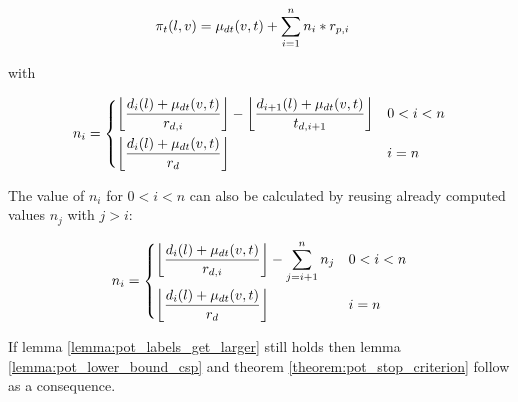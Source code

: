 \begin{align}\label{eq:multiple_pauses_pot}
	\pi_t(l,v) & = \drivingtime(v,t) + \sum_{i=1}^n{ n_i * \restr_{p,i}}
\end{align}

with

\begin{align}\label{eq:number_pauses}
	n_i =\begin{dcases}
		\floor*{ \frac{d_{i}(l) + \drivingtime(v,t)}{\restr_{d,i}} } - \floor*{ \frac{d_{i+1}(l) + \drivingtime(v,t)}{t_{d,i+1}} } & 0 < i < n \\
		\floor*{ \frac{d_{i}(l) + \drivingtime(v,t)}{\restr_d} }                                                                   & i=n
	\end{dcases}
\end{align}

The value of $n_i$ for $0 < i < n$ can also be calculated by reusing already computed values $n_j$ with $j > i$:

\begin{align*}
	n_i =\begin{dcases}
		\floor*{ \frac{d_{i}(l) + \drivingtime(v,t)}{\restr_{d,i}} } - \sum_{j=i+1}^{n}{n_{j} } & 0 < i < n \\
		\floor*{ \frac{d_{i}(l) + \drivingtime(v,t)}{\restr_d} }                                & i=n
	\end{dcases}
\end{align*}

If lemma \ref{lemma:pot_labels_get_larger} still holds then lemma \ref{lemma:pot_lower_bound_csp} and theorem \ref{theorem:pot_stop_criterion} follow as a consequence.



